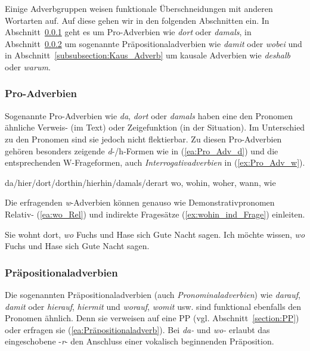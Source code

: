 Einige Adverbgruppen weisen funktionale Überschneidungen mit anderen Wortarten auf. Auf diese gehen wir in den folgenden Abschnitten ein. In Abschnitt~\ref{subsubsection:Pro_Adverbien} geht es um Pro-Adverbien wie \textit{dort} oder \textit{damals}, in Abschnitt~\ref{subsubsection:Präpositionaladverb} um sogenannte Präpositionaladverbien wie \textit{damit} oder \textit{wobei} und in Abschnitt~\ref{subsubsection:Kaus_Adverb} um kausale Adverbien wie \textit{deshalb} oder \textit{warum}.


\subsubsection{Pro-Adverbien}\label{subsubsection:Pro_Adverbien}

Sogenannte Pro-Adverbien wie \textit{da}, \textit{dort} oder \textit{damals} haben eine den Pronomen ähnliche Verweis- (im Text) oder Zeigefunktion (in der Situation). Im Unterschied zu den Pronomen sind sie jedoch nicht flektierbar. Zu diesen Pro-Adverbien gehören besonders zeigende \textit{d}-/{h}-Formen wie in (\ref{ea:Pro_Adv_d}) und die entsprechenden W-Frageformen, auch \textit{Interrogativadverbien} in (\ref{ex:Pro_Adv_w}).

\ea \label{ea:Pro_Adv}
\ea \label{ea:Pro_Adv_d} da/hier/dort/dorthin/hierhin/damals/derart
\ex \label{ex:Pro_Adv_w} wo, wohin, woher, wann, wie
\z 
\z 

Die erfragenden \textit{w}-Adverbien können genauso wie Demonstrativpronomen Relativ- (\ref{ea:wo_Rel}) und indirekte Fragesätze (\ref{ex:wohin_ind_Frage}) einleiten.

\ea \label{ea:wAdv_Rel}
\ea \label{ea:wo_Rel} Sie wohnt dort, \textit{wo} Fuchs und Hase sich Gute Nacht sagen.
\ex \label{ex:wohin_ind_Frage} Ich möchte wissen, \textit{wo} Fuchs und Hase sich Gute Nacht sagen.
\z 
\z 


\subsubsection{Präpositionaladverbien}\label{subsubsection:Präpositionaladverb}

Die sogenannten Präpositionaladverbien (auch \textit{Pronominaladverbien}) wie \textit{darauf}, \textit{damit} oder \textit{hierauf}, \textit{hiermit} und \textit{worauf}, \textit{womit} usw. sind funktional ebenfalls den Pronomen ähnlich. Denn sie verweisen auf eine PP (vgl. Abschnitt~\ref{section:PP}) oder erfragen sie (\ref{ea:Präpositionaladverb}). Bei \textit{da-} und \textit{wo-} erlaubt das eingeschobene -\textit{r}- den Anschluss einer vokalisch beginnenden Präposition.    

